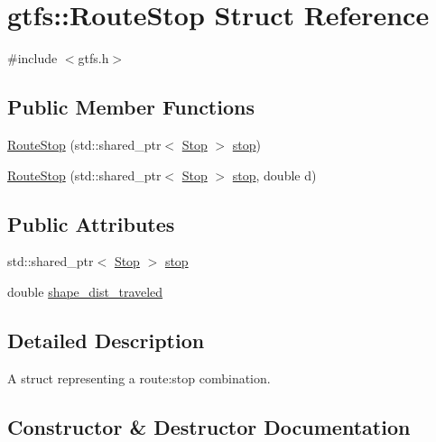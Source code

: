 \hypertarget{structgtfs_1_1RouteStop}{}\section{gtfs\+:\+:Route\+Stop Struct Reference}
\label{structgtfs_1_1RouteStop}


{\ttfamily \#include $<$gtfs.\+h$>$}

\subsection*{Public Member Functions}
\begin{DoxyCompactItemize}
\item 
\hyperlink{structgtfs_1_1RouteStop_a6ec05e2393ac8980e5c8a71d74c6d70d}{Route\+Stop} (std\+::shared\+\_\+ptr$<$ \hyperlink{classgtfs_1_1Stop}{Stop} $>$ \hyperlink{structgtfs_1_1RouteStop_af70ced2604121bbeb159da66bbd00c64}{stop})
\item 
\hyperlink{structgtfs_1_1RouteStop_a5f3dba72665e9731bad7a844bee4a949}{Route\+Stop} (std\+::shared\+\_\+ptr$<$ \hyperlink{classgtfs_1_1Stop}{Stop} $>$ \hyperlink{structgtfs_1_1RouteStop_af70ced2604121bbeb159da66bbd00c64}{stop}, double d)
\end{DoxyCompactItemize}
\subsection*{Public Attributes}
\begin{DoxyCompactItemize}
\item 
std\+::shared\+\_\+ptr$<$ \hyperlink{classgtfs_1_1Stop}{Stop} $>$ \hyperlink{structgtfs_1_1RouteStop_af70ced2604121bbeb159da66bbd00c64}{stop}
\item 
double \hyperlink{structgtfs_1_1RouteStop_ab738c008a00eab17953ab124a86ca207}{shape\+\_\+dist\+\_\+traveled}
\end{DoxyCompactItemize}


\subsection{Detailed Description}
A struct representing a route\+:stop combination. 

\subsection{Constructor \& Destructor Documentation}
